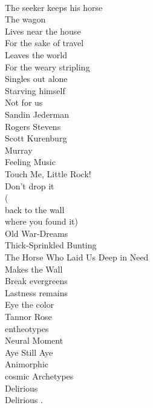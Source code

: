 \documentclass[smalldemyvopaper,11pt,twoside,onecolumn,openright,extrafontsizes]{memoir}
\newlength\drop
\begin{document}
\\The seeker keeps his horse
\\The wagon
\\Lives near the house
\\For the sake of travel
\\Leaves the world
\\For the weary stripling
\\Singles out alone
\\Starving himself
\\Not for us
\\Sandin Jederman
\\Rogers Stevens
\\Scott Kurenburg
\\Murray
\\Feeling Music
\\Touch Me, Little Rock!
\\Don't drop it
\\(
\\back to the wall
\\where you found it)
\\Old War-Dreams
\\Thick-Sprinkled Bunting
\\The Horse Who Laid Us Deep in Need
\\Makes the Wall
\\Break evergreens
\\Lastness remains
\\Eye the color
\\Tannor Rose
\\entheotypes
\\Neural Moment
\\Aye Still Aye
\\Animorphic
\\cosmic Archetypes
\\Delirious
\\Delirious .
\end{document}
